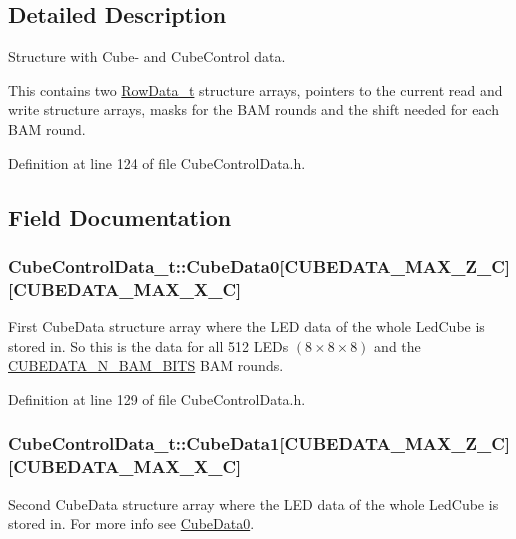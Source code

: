 \subsection{Detailed Description}
Structure with Cube-\/ and Cube\+Control data. 

This contains two \hyperlink{struct_row_data__t}{Row\+Data\+\_\+t} structure arrays, pointers to the current read and write structure arrays, masks for the B\+A\+M rounds and the shift needed for each B\+A\+M round. 

Definition at line 124 of file Cube\+Control\+Data.\+h.



\subsection{Field Documentation}
\hypertarget{struct_cube_control_data__t_a4fcbd72fab1f862e17acc3f96efe8d4c}{}
\subsubsection[{Cube\+Data0}]{ Cube\+Control\+Data\+\_\+t\+::\+Cube\+Data0\mbox{[}{\bf C\+U\+B\+E\+D\+A\+T\+A\+\_\+\+M\+A\+X\+\_\+\+Z\+\_\+\+C}\mbox{]}\mbox{[}{\bf C\+U\+B\+E\+D\+A\+T\+A\+\_\+\+M\+A\+X\+\_\+\+X\+\_\+\+C}\mbox{]}}\label{struct_cube_control_data__t_a4fcbd72fab1f862e17acc3f96efe8d4c}
First Cube\+Data structure array where the L\+E\+D data of the whole Led\+Cube is stored in. So this is the data for all 512 L\+E\+Ds $ { (8 \times 8 \times 8) } $ and the \hyperlink{_cube_control_data_8h_ae8163b1995363e0daae4ac54ee4d1dd9}{C\+U\+B\+E\+D\+A\+T\+A\+\_\+\+N\+\_\+\+B\+A\+M\+\_\+\+B\+I\+T\+S} B\+A\+M rounds. 

Definition at line 129 of file Cube\+Control\+Data.\+h.

\hypertarget{struct_cube_control_data__t_a647ae59f9e5f0842d92ef0241db2a141}{}
\subsubsection[{Cube\+Data1}]{ Cube\+Control\+Data\+\_\+t\+::\+Cube\+Data1\mbox{[}{\bf C\+U\+B\+E\+D\+A\+T\+A\+\_\+\+M\+A\+X\+\_\+\+Z\+\_\+\+C}\mbox{]}\mbox{[}{\bf C\+U\+B\+E\+D\+A\+T\+A\+\_\+\+M\+A\+X\+\_\+\+X\+\_\+\+C}\mbox{]}}\label{struct_cube_control_data__t_a647ae59f9e5f0842d92ef0241db2a141}
Second Cube\+Data structure array where the L\+E\+D data of the whole Led\+Cube is stored in. For more info see \hyperlink{struct_cube_control_data__t_a4fcbd72fab1f862e17acc3f96efe8d4c}{Cube\+Data0}. 

